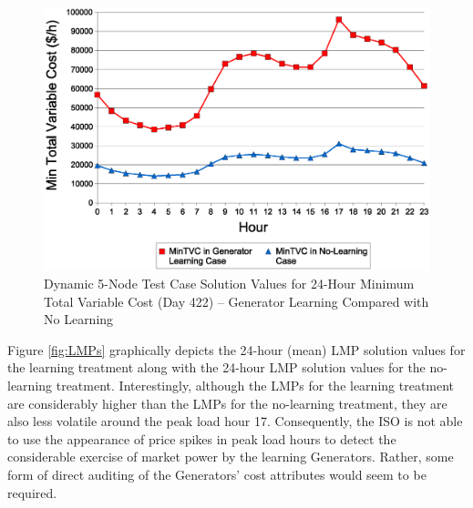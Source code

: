 \documentclass[12pt]{article}
\begin{document}
\begin{figure}
	\centering
		\includegraphics[totalheight = 10cm]{AMES.Results.CompareMinTVC.eps}
	\caption{Dynamic 5-Node Test Case Solution Values for 24-Hour Minimum Total Variable Cost (Day 422) -- Generator Learning Compared with No Learning }
	\label{fig:CompareMinTVC}
\end{figure} 


Figure \ref{fig:LMPs} graphically depicts the 24-hour (mean) LMP solution values for the learning treatment along with the 24-hour LMP solution values for the no-learning treatment.  Interestingly, although the LMPs for the learning treatment are considerably higher than the LMPs for the no-learning treatment, they are also less volatile around the peak load hour 17.  Consequently, the ISO is not able to use the appearance of price spikes in peak load hours to detect the considerable exercise of market power by the learning Generators.  Rather, some form of direct auditing of the Generators' cost attributes would seem to be required.  

\end{document}
